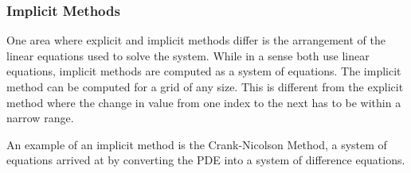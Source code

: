 
	



\subsubsection{Implicit Methods}

One area where explicit and implicit methods differ is the arrangement of the linear equations used to solve the system.  %
While in a sense both use linear equations, implicit methods are computed as a system of equations. %
The implicit method can be computed for a grid of any size.  This is different from the explicit method where the change in value from one index to the next has to be within a narrow range.  

An example of an implicit method is the Crank-Nicolson Method,  a %
system of equations arrived at by converting the PDE into a system of difference equations.   

